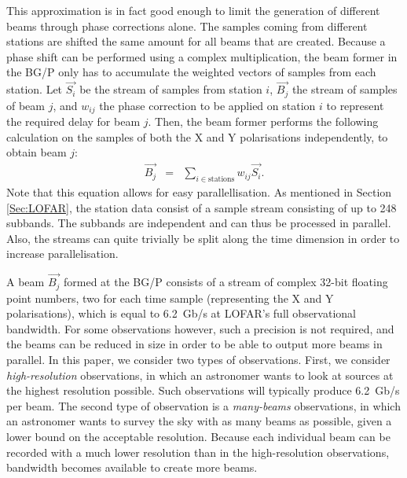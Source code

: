 \documentclass{llncs}
\begin{document}
This approximation is in fact good enough to limit the generation of different beams through phase corrections alone. The samples coming from different stations are shifted the same amount for all beams that are created. Because a phase shift can be performed using a complex multiplication, the beam former in the BG/P only has to accumulate the weighted vectors of samples from each station. Let $\overrightarrow{S_i}$ be the stream of samples from station $i$, $\overrightarrow{B_j}$ the stream of samples of beam $j$, and $w_{ij}$ the phase correction to be applied on station $i$ to represent the required delay for beam $j$. Then, the beam former performs the following calculation on the samples of both the X and Y polarisations independently, to obtain beam $j$:
\begin{eqnarray}
\overrightarrow{B_j} & = & \sum_{i \in \textrm{stations}}w_{ij}\overrightarrow{S_i}.
\end{eqnarray}
Note that this equation allows for easy parallellisation. As mentioned in Section \ref{Sec:LOFAR}, the station data consist of a sample stream consisting of up to 248 subbands. The subbands are independent and can thus be processed in parallel. Also, the streams can quite trivially be split along the time dimension in order to increase parallelisation. 

A beam $\overrightarrow{B_j}$ formed at the BG/P consists of a stream of complex 32-bit floating point numbers, two for each time sample (representing the X and Y polarisations), which is equal to 6.2~Gb/s at LOFAR's full observational bandwidth. For some observations however, such a precision is not required, and the beams can be reduced in size in order to be able to output more beams in parallel. In this paper, we consider two types of observations. First, we consider \emph{high-resolution} observations, in which an astronomer wants to look at sources at the highest resolution possible. Such observations will typically produce 6.2~Gb/s per beam. The second type of observation is a \emph{many-beams} observations, in which an astronomer wants to survey the sky with as many beams as possible, given a lower bound on the acceptable resolution. Because each individual beam can be recorded with a much lower resolution than in the high-resolution observations, bandwidth becomes available to create more beams.
\end{document}
